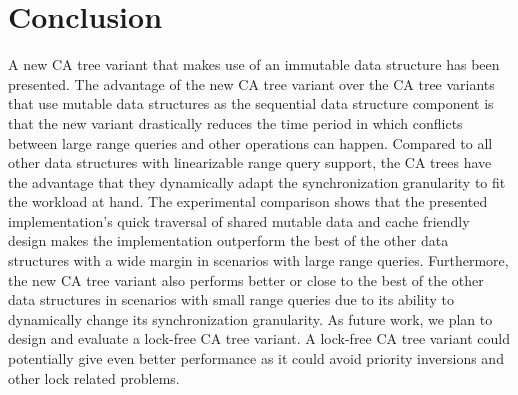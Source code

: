 \documentclass[a4paper,UKenglish]{oasics-v2016}
\begin{document}
 \section{Conclusion\label{sec:conc}}
 A new CA tree variant that makes use of an immutable data structure has been presented.
 The advantage of the new CA tree variant over the CA tree variants that use mutable data structures as the sequential data structure component is that the new variant drastically reduces the time period in which conflicts between large range queries and other operations can happen.
 Compared to all other data structures with linearizable range query support, the CA trees have the advantage that they dynamically adapt the synchronization granularity to fit the workload at hand.
 The experimental comparison shows that the presented implementation's quick traversal of shared mutable data and cache friendly design  makes the implementation outperform the best of the other data structures with a wide margin in scenarios with large range queries.
 Furthermore, the new CA tree variant also performs better or close to the best of the other data structures in scenarios with small range queries due to its ability to dynamically change its synchronization granularity.  
 As future work, we plan to design and evaluate a lock-free CA tree variant.
 A lock-free CA tree variant could potentially give even better performance as it could avoid priority inversions and other lock related problems.
 


\end{document}
